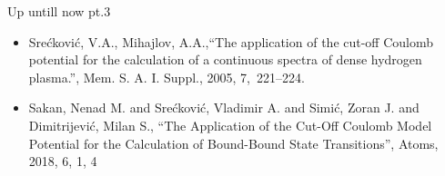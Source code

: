 \documentclass{beamer}
\begin{document}
\begin{frame}{Up untill now pt.3}

    \begin{itemize}
     \item {Sre{\'c}kovi{\'c}}, V.A., {Mihajlov}, A.A.,``The application of the cut-off Coulomb potential for the calculation of a continuous spectra of dense hydrogen plasma.'', Mem. S. A. I. Suppl., 2005, 7,~221--224.
     
     \item Sakan, Nenad M. and Srećković, Vladimir A. and Simić, Zoran J. and Dimitrijević, Milan S., ``The Application of the Cut-Off Coulomb Model Potential for the Calculation of Bound-Bound State Transitions'', Atoms, 2018, 6, 1, 4
    \end{itemize}
\end{frame}
\end{document}
